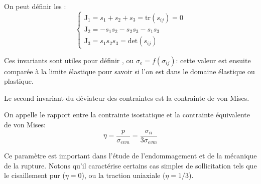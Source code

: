 On peut définir les :
\begin{equation}  
\left\{\begin{array}{l}  \mathrm{J}_1 = s_{1} + s_{2} + s_{3} = \mathrm{tr}(s_{ij}) = 0 \\
\mathrm{J}_2 = - s_1 s_2 - s_2 s_3 - s_1 s_3 \\
\mathrm{J}_3 = s_1 s_2 s_3 = \mathrm{det}(s_{ij}) 
\end{array}\right.
\end{equation}

Ces invariants sont utiles pour définir , 
ou  $\sigma_e=f(\sigma_{ij})$: 
cette valeur est ensuite comparée  à la limite élastique pour savoir si l'on est dans le domaine 
élastique ou plastique.

\medskip
Le second invariant du déviateur des contraintes est la contrainte de von 
Mises.

\medskip
On appelle  le rapport entre la contrainte 
isostatique et la contrainte équivalente de von Mises:
\begin{equation} \eta = \frac{p}{\sigma_{e vm}} = \frac{\sigma_{ii}}{3\sigma_{e vm}} \end{equation}

Ce paramètre est important dans l'étude de l'endommagement et de la mécanique de la rupture. 
Notons qu'il caractérise certains cas simples de sollicitation tels que 
le cisaillement pur ($\eta= 0$), ou la traction uniaxiale ($\eta = 1/3$).


